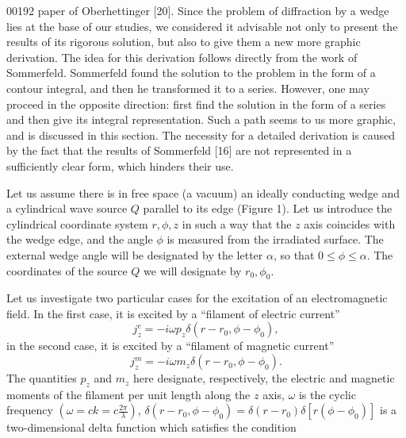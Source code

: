 \begin{scanpage}{0019}{2}
paper of Oberhettinger [20]. Since the problem of diffraction by a wedge lies at the base of our studies, we considered it advisable not only to present the results of its rigorous solution, but also to give them a new more graphic derivation. The idea for this derivation follows directly from the work of Sommerfeld. Sommerfeld found the solution to the problem in the form of a contour integral, and then he transformed it to a series. However, one may proceed in the opposite direction: first find the solution in the form of a series and then give its integral representation. Such a path seems to us more graphic, and is discussed in this section. The necessity for a detailed derivation is caused by the fact that the results of Sommerfeld [16] are not represented in a sufficiently clear form, which hinders their use.

Let us assume there is in free space (a vacuum) an ideally conducting wedge and a cylindrical wave source $Q$ parallel to its edge (Figure 1). Let us introduce the cylindrical coordinate system $r,\phi,z$ in such a way that the $z$ axis coincides with the wedge edge, and the angle $\phi$ is measured from the irradiated surface. The external wedge angle will be designated by the letter $\alpha$, so that $0\leq\phi\leq\alpha$. The coordinates of the source $Q$ we will designate by $r_0,\phi_0$.

Let us investigate two particular cases for the excitation of an electromagnetic field. In the first case, it is excited by a ``filament of electric current''
\[j_z^e=-i\omega p_z\delta(r-r_0,\phi-\phi_0),\tag{1.01}\]
in the second case, it is excited by a ``filament of magnetic current''
\[j_z^m=-i\omega m_z\delta(r-r_0,\phi-\phi_0).\tag{1.02}\]
The quantities $p_z$ and $m_z$ here designate, respectively, the electric and magnetic moments of the filament per unit length along the $z$ axis, $\omega$ is the cyclic frequency $\left(\omega=ck=c\frac{2\pi}{\lambda}\right)$, $\delta(r-r_0,\phi-\phi_0)=\delta(r-r_0)\delta[r(\phi-\phi_0)]$ is a two-dimensional delta function which satisfies the condition
\end{scanpage}
